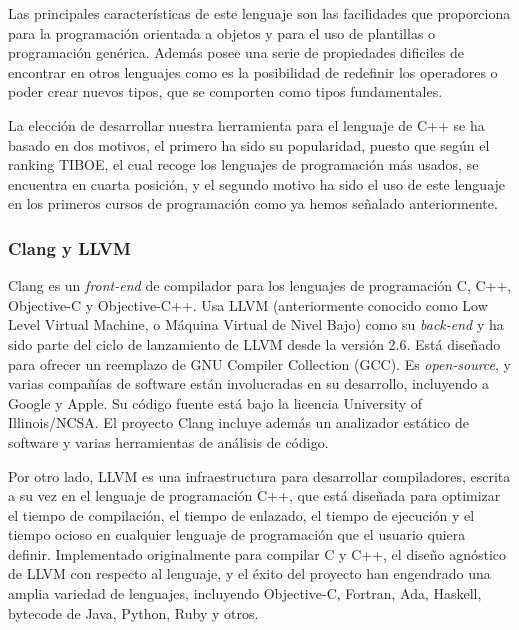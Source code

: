 Las principales caracter\'isticas de este lenguaje son las facilidades que proporciona para la programaci\'on orientada a objetos y para el uso de plantillas o programaci\'on gen\'erica. Adem\'as posee una serie de propiedades dificiles de encontrar en otros lenguajes como es la posibilidad de redefinir los operadores o poder crear nuevos tipos, que se comporten como tipos fundamentales.

La elecci\'on de desarrollar nuestra herramienta para el lenguaje de C++ se ha basado en dos motivos, el primero ha sido su popularidad, puesto que seg\'un el ranking TIBOE, el cual recoge los lenguajes de programaci\'on m\'as usados, se encuentra en cuarta posici\'on, y el segundo motivo ha sido el uso de este lenguaje en los primeros cursos de programaci\'on como ya hemos se\~nalado anteriormente.

\subsubsection*{Clang y LLVM}
\label{ap2:sec:clang}

Clang es un {\it front-end} de compilador para los lenguajes de programaci\'on C, C++, Objective-C y Objective-C++. Usa LLVM (anteriormente conocido como Low Level Virtual Machine, o M\'aquina Virtual de Nivel Bajo) como su {\it back-end} y ha sido parte del ciclo de lanzamiento de LLVM desde la versi\'on 2.6. Est\'a dise\~nado para ofrecer un reemplazo de GNU Compiler Collection (GCC). Es {\it open-source}, y varias compa\~n\'ias de software est\'an involucradas en su desarrollo, incluyendo a Google y Apple. Su c\'odigo fuente est\'a bajo la licencia University of Illinois/NCSA. El proyecto Clang incluye adem\'as un analizador est\'atico de software y varias herramientas de an\'alisis de c\'odigo.

Por otro lado, LLVM es una infraestructura para desarrollar compiladores, escrita a su vez en el lenguaje de programaci\'on C++, que est\'a dise\~nada para optimizar el tiempo de compilaci\'on, el tiempo de enlazado, el tiempo de ejecuci\'on y el tiempo ocioso en cualquier lenguaje de programaci\'on que el usuario quiera definir. Implementado originalmente para compilar C y C++, el dise\~no agn\'ostico de LLVM con respecto al lenguaje, y el \'exito del proyecto han engendrado una amplia variedad de lenguajes, incluyendo Objective-C, Fortran, Ada, Haskell, bytecode de Java, Python, Ruby y otros.

